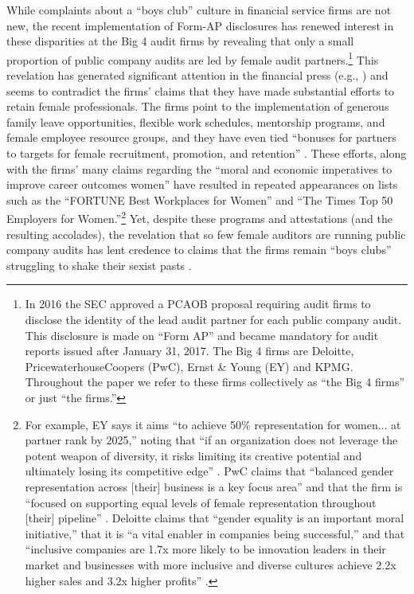 \documentclass[11pt]{article}
\begin{document}
    While complaints about a ``boys club'' culture in financial service firms are not new, the recent implementation of Form-AP disclosures has renewed interest in these disparities at the Big 4 audit firms by revealing that only a small proportion of public company audits are led by female audit partners.\footnote{In 2016 the SEC approved a PCAOB proposal requiring audit firms to disclose the identity of the lead audit partner for each public company audit. This disclosure is made on ``Form AP'' and became mandatory for audit reports issued after January 31, 2017. The Big 4 firms are Deloitte, PricewaterhouseCoopers (PwC), Ernst \& Young (EY) and KPMG. Throughout the paper we refer to these firms collectively as ``the Big 4 firms'' or just ``the firms.''} This revelation has generated significant attention in the financial press (e.g., \cite{rapoportWomenRarelyRun2018, lucasWhyFewWomen2025,kissinBigFourAccounting2025}) and seems to contradict the firms' claims that they have made substantial efforts to retain female professionals. The firms point to the implementation of generous family leave opportunities, flexible work schedules, mentorship programs, and female employee resource groups, and they have even tied ``bonuses for partners to targets for female recruitment, promotion, and retention'' \parencite{marriageBigFourAccountants2018}. These efforts, along with the firms' many claims regarding the ``moral and economic imperatives to improve career outcomes women'' have resulted in repeated appearances on lists such as the ``FORTUNE Best Workplaces for Women'' and ``The Times Top 50 Employers for Women.''\footnote{For example, EY says it aims ``to achieve 50\% representation for women... at partner rank by 2025,'' noting that ``if an organization does not leverage the potent weapon of diversity, it risks limiting its creative potential and ultimately losing its competitive edge'' \parencite{eyEYUSDiversity2022, edgleyDiversityProfessionalismBig2016}. PwC claims that ``balanced gender representation across [their] business is a key focus area'' and that the firm is ``focused on supporting equal levels of female representation throughout [their] pipeline'' \parencite{pwcGenderEquity2023}. Deloitte claims that ``gender equality is an important moral initiative,'' that it is ``a vital enabler in companies being successful,'' and that ``inclusive companies are 1.7x more likely to be innovation leaders in their market and businesses with more inclusive and diverse cultures achieve 2.2x higher sales and 3.2x higher profits'' \parencite{davidsonHowEquityCan2023}.}  Yet, despite these programs and attestations (and the resulting accolades), the revelation that so few female auditors are running public company audits has lent credence to claims that the firms remain ``boys clubs'' struggling to shake their sexist pasts \parencite{kellsBigFourAccounting2018}. 
    
\end{document}
